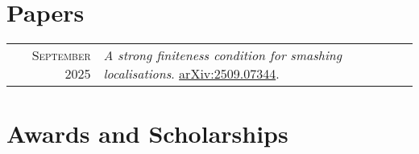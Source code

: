 \documentclass[a4paper,11pt]{article} %
\begin{document}

\section{Papers}

\begin{tabular}{rl}

\textsc{September} 2025 & \emph{A strong finiteness condition for smashing localisations}. \href{https://arxiv.org/abs/2509.07344}{arXiv:2509.07344}.\\

\end{tabular}


\section{Awards and Scholarships}
\end{document}
